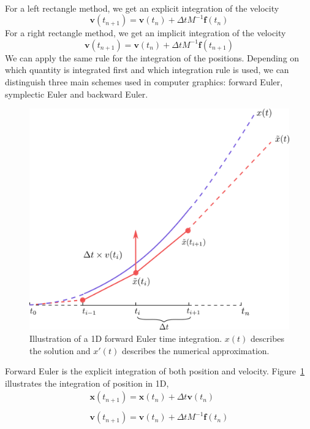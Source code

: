 \\
For a left rectangle method, we get an explicit integration of the velocity
\begin{equation}
\label{eq:explicitIntegration}
\mathbf{v}(t_{n+1}) = \mathbf{v}(t_{n}) + \Delta t M^{-1}\mathbf{f}(t_{n})
\end{equation}
For a right rectangle method, we get an implicit integration of the velocity
\begin{equation}
\label{eq:implicitIntegration}
\mathbf{v}(t_{n+1}) = \mathbf{v}(t_{n}) + \Delta t M^{-1}\mathbf{f}(t_{n+1})
\end{equation}
We can apply the same rule for the integration of the positions.
Depending on which quantity is integrated first and which integration rule is used, we can distinguish three main schemes used in computer graphics: forward Euler, symplectic Euler and backward Euler.
\begin{figure}[!ht]
	\centering
	\includegraphics[scale=0.6]{images/continuum_mechanics/timeIntegration.png}
	\caption[STAR mechanics: Temporal integration]{\label{fig:timeIntegration} 
		Illustration of a 1D forward Euler time integration. 
		$x(t)$ describes the solution and $x'(t)$ describes the numerical approximation.}
\end{figure}
Forward Euler is the explicit integration of both position and velocity.
Figure~\ref{fig:timeIntegration} illustrates the integration of position in 1D,
\begin{equation}
\label{eq:explicitEuler}
\begin{array}{l}
\displaystyle \mathbf{x}(t_{n+1}) = \mathbf{x}(t_{n}) + \Delta t \mathbf{v}(t_{n}) \\ \\
\displaystyle \mathbf{v}(t_{n+1}) = \mathbf{v}(t_{n}) + \Delta t M^{-1}\mathbf{f}(t_{n})
\end{array}
\end{equation}
